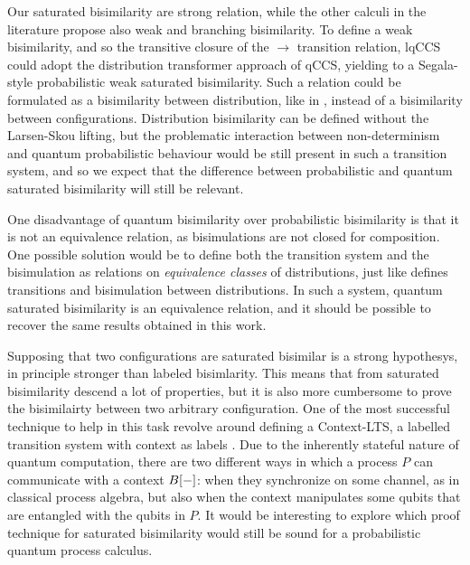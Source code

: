 Our saturated bisimilarity are strong relation, while the other calculi in the literature propose also weak and branching bisimilarity. To define a weak bisimilarity, and so the transitive closure of the $\rightarrow$ transition relation, lqCCS could adopt the distribution transformer approach of qCCS, yielding to a Segala-style probabilistic weak saturated bisimilarity. Such a relation could be formulated as a bisimilarity between distribution, like in \cite{hennessyExploringProbabilisticBisimulations2012}, instead of a bisimilarity between configurations. Distribution bisimilarity can be defined without the Larsen-Skou lifting, but the problematic interaction between non-determinism and quantum probabilistic behaviour would be still present in such a transition system, and so we expect that the difference between probabilistic and quantum saturated bisimilarity will still be relevant.

One disadvantage of quantum bisimilarity over probabilistic bisimilarity is that it is not an equivalence relation, as bisimulations are not closed for composition. One possible solution would be to define both the transition system and the bisimulation as relations on \textit{equivalence classes} of distributions, just like \cite{hennessyExploringProbabilisticBisimulations2012} defines transitions and bisimulation between distributions. In such a system, quantum saturated bisimilarity is an equivalence relation, and it should be possible to recover the same results obtained in this work.

Supposing that two configurations are saturated bisimilar is a strong hypothesys, in principle stronger than labeled bisimlarity. This means that from saturated bisimilarity descend a lot of properties, but it is also more cumbersome to prove the bisimilairty between two arbitrary configuration. One of the most successful technique to help in this task revolve around defining a Context-LTS, a labelled transition system with context as labels \cite{bonchiGeneralTheoryBarbs2014}. Due to the inherently stateful nature of quantum computation, there are two different ways in which a process $P$ can communicate with a context $B[{-}]$: when they synchronize on some channel, as in classical process algebra, but also when the context manipulates some qubits that are entangled with the qubits in $P$. It would be interesting to explore which proof technique for saturated bisimilarity would still be sound for a probabilistic quantum process calculus.